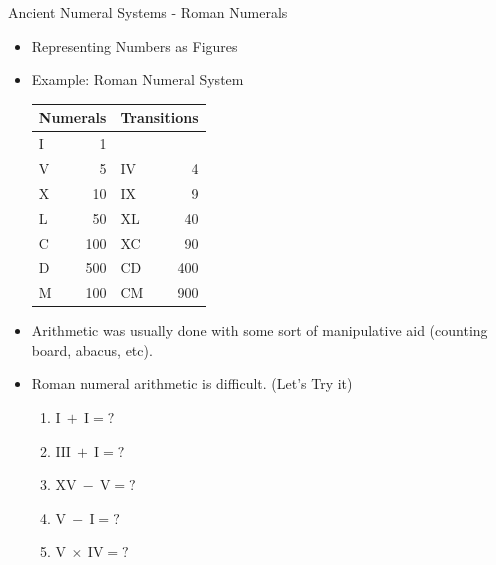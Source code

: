 \documentclass{beamer}
\begin{document}
\begin{frame}{Ancient Numeral Systems - Roman Numerals}
\begin{itemize}[<+(1)->]
    \item Representing Numbers as Figures
    \item Example: Roman Numeral System
    
    \begin{tabular}{|lr|lr|}
    \hline
    \multicolumn{2}{|c|}{Numerals} & \multicolumn{2}{|c|}{Transitions} \\
    \hline
    I & 1 & &\\
    V & 5 & IV & 4\\
    X & 10 & IX & 9\\
    L & 50 & XL & 40 \\
    C & 100 & XC & 90\\
    D & 500 & CD & 400\\ 
    M & 100 & CM & 900\\
    \hline
    \end{tabular}
\end{itemize}
\end{frame}

\begin{frame}
\begin{itemize}[<+(1)->]
    \item Arithmetic was usually done with some sort of manipulative aid (counting board, abacus, etc).
    \item Roman numeral arithmetic is difficult. (Let's Try it)
    \begin{enumerate}
        \item $\mathrm{I}\ +\ \mathrm{I}=?$
        \item $\mathrm{III}\ +\ \mathrm{I}=?$
        \item $\mathrm{XV}\ -\ \mathrm{V}=?$
        \item $\mathrm{V}\ -\ \mathrm{I}=?$
        \item $\mathrm{V}\ \times\ \mathrm{IV}=?$
    \end{enumerate}
\end{itemize}
\end{frame}
\end{document}

